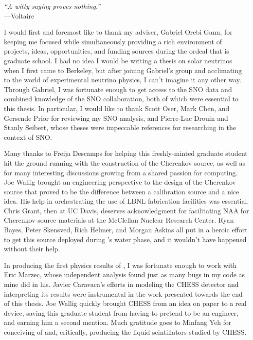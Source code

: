 \documentclass[12pt,letterpaper,oldfontcommands]{ucbthesis}
\begin{document}
\begin{frontmatter}

\begin{dedication}
\null\vfil
\begin{center}
\textit{``A witty saying proves nothing.''} \\
\hspace{100pt}---Voltaire
\end{center}
\vfil\null
\end{dedication}

\tableofcontents
\clearpage
\listoffigures
\clearpage
\listoftables
\clearpage


\begin{acknowledgements}

I would first and foremost like to thank my adviser, Gabriel Orebi Gann, for keeping me focused while simultaneously providing a rich environment of projects, ideas, opportunities, and funding sources during the ordeal that is graduate school. 
I had no idea I would be writing a thesis on solar neutrinos when I first came to Berkeley, but after joining Gabriel's group and acclimating to the world of experimental neutrino physics, I can't imagine it any other way.
Through Gabriel, I was fortunate enough to get access to the SNO data and combined knowledge of the SNO collaboration, both of which were essential to this thesis.
In particular, I would like to thank Scott Oser, Mark Chen, and Gersende Prior for reviewing my SNO analysis, and Pierre-Luc Drouin and Stanly Seibert, whose theses were impeccable references for researching in the context of SNO.

Many thanks to Freija Descamps for helping this freshly-minted graduate student hit the ground running with the construction of the Cherenkov source, as well as for many interesting discussions growing from a shared passion for computing.
Joe Wallig brought an engineering perspective to the design of the Cherenkov source that proved to be the difference between a calibration source and a nice idea.
His help in orchestrating the use of LBNL fabrication facilities was essential.
Chris Grant, then at UC Davis, deserves acknowledgment for facilitating NAA for Cherenkov source materials at the McClellan Nuclear Research Center.
Ryan Bayes, Peter Skensved, Rich Helmer, and Morgan Askins all put in a heroic effort to get this source deployed during {\snop}'s water phase, and it wouldn't have happened without their help.

In producing the first physics results of {\snop}, I was fortunate enough to work with Eric Marzec, whose independent analysis found just as many bugs in my code as mine did in his.
Javier Caravaca's efforts in modeling the CHESS detector and interpreting its results were instrumental in the work presented towards the end of this thesis.
Joe Wallig quickly brought CHESS from an idea on paper to a real device, saving this graduate student from having to pretend to be an engineer, and earning him a second mention.
Much gratitude goes to Minfang Yeh for conceiving of and, critically, producing the liquid scintillators studied by CHESS. 


\end{acknowledgements}
\end{frontmatter}
\end{document}
